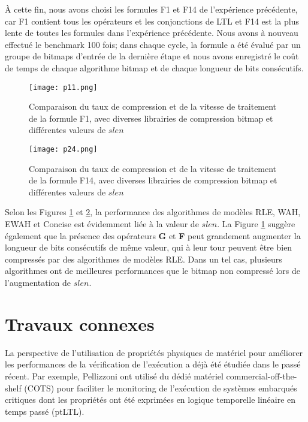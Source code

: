 À cette fin, nous avons choisi les formules F1 et F14 de l'expérience précédente, car F1 contient tous les opérateurs et les conjonctions de LTL et F14 est la plus lente de toutes les formules dans l'expérience précédente. Nous avons à nouveau effectué le benchmark 100 fois; dans chaque cycle, la formule a été évalué par un groupe de bitmaps d'entrée de la dernière étape et nous avons enregistré le coût de temps de chaque algorithme bitmap et de chaque longueur de bits consécutifs.

\begin{figure}[h]
\begin{center}
\centering
\texttt{[image: p11.png]}
\caption{Comparaison du taux de compression et de la vitesse de traitement de la formule F1, avec diverses librairies de compression bitmap et différentes valeurs de $slen$}
\label{img:f1}
\end{center}
\end{figure}

\begin{figure}[h]
\begin{center}
\centering
\texttt{[image: p24.png]}
\caption{Comparaison du taux de compression et de la vitesse de traitement de la formule F14, avec diverses librairies de compression bitmap et différentes valeurs de $slen$}
\label{img:f14}
\end{center}
\end{figure}

Selon les Figures \ref{img:f1} et \ref{img:f14}, la performance des algorithmes de modèles RLE, WAH, EWAH et Concise est évidemment liée à la valeur de $slen$. La Figure \ref{img:f1} suggère également que la présence des opérateurs \textbf{G} et \textbf{F} peut grandement augmenter la longueur de bits consécutifs de même valeur, qui à leur tour peuvent être bien compressés par des algorithmes de modèles RLE. Dans un tel cas, plusieurs algorithmes ont de meilleures performances que le bitmap non compressé lors de l'augmentation de $slen$.



\section{Travaux connexes}\label{sec:bm:related} %

La perspective de l'utilisation de propriétés physiques de matériel pour améliorer les performances de la vérification de l'exécution a déjà été étudiée dans le passé récent. Par exemple, Pellizzoni \etal\@ \citep{pellizzoni2008hardware} ont utilisé du dédié matériel commercial-off-the-shelf (COTS) \citep{emerson1990temporal} pour faciliter le monitoring de l'exécution de systèmes embarqués critiques dont les propriétés ont été exprimées en logique temporelle linéaire en temps passé (ptLTL).

